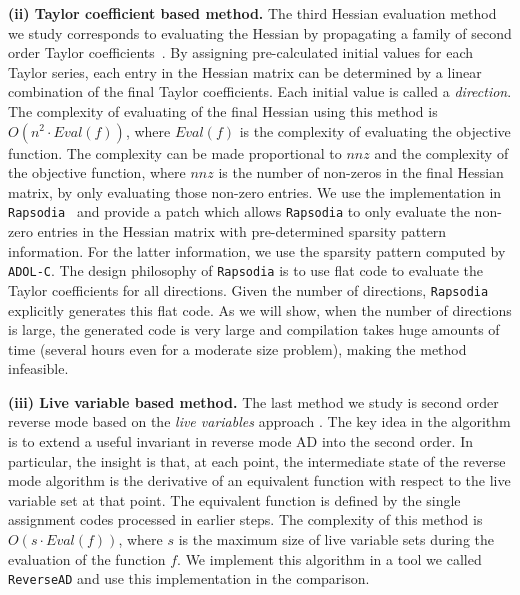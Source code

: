 \documentclass[11pt, a4paper, english]{article}
\begin{document}
{\bf (ii) Taylor coefficient based method. } 
The third Hessian evaluation method  we study  corresponds to evaluating the Hessian by propagating a family of second order Taylor coefficients~\cite{griewank2000evaluating}. 
By assigning pre-calculated initial values for each Taylor series, each entry in the Hessian matrix  can be determined by a linear combination of the final Taylor coefficients. Each initial value is called a {\em direction}.
The complexity of evaluating of the final Hessian using this method is $O(n^2 \cdot Eval(f))$, where $Eval(f)$ is the complexity of evaluating the objective function.
The complexity can be made proportional to $nnz$ and the complexity of the objective function, where $nnz$ is the number of non-zeros in the final Hessian matrix, by only evaluating those non-zero entries.
We use the implementation in {\tt Rapsodia}~\cite{charpentier2009fast} and provide a patch which allows {\tt Rapsodia} to only evaluate the non-zero entries in the Hessian matrix with pre-determined sparsity pattern information. For the latter information, we use the sparsity pattern computed by {\tt ADOL-C}. The design philosophy of {\tt Rapsodia} is to use flat code to evaluate the Taylor coefficients for all directions. Given the number of directions, {\tt Rapsodia} explicitly generates this flat code. As we will show, when the number of directions is large, the generated code is very large and compilation takes huge amounts of time (several hours even for a moderate size problem), making the method infeasible. 

{\bf (iii) Live variable based method. }
The last method we study is second order reverse mode based on the {\em live variables} approach \cite{wang2016capitalizing}. The key idea in the algorithm is to extend a useful invariant in reverse mode AD into the second order. In particular, the insight is that, at each point, the intermediate state of the reverse mode algorithm is the derivative of an equivalent function with respect to the live variable set at that point. The equivalent function is defined by the single assignment codes processed in earlier steps. 
The complexity of this method is $O(s \cdot Eval(f))$, where $s$ is the maximum size of live variable sets during the evaluation of the function $f$.
We implement this algorithm in a tool we called {\tt ReverseAD} and use this implementation in the comparison.
\end{document}
